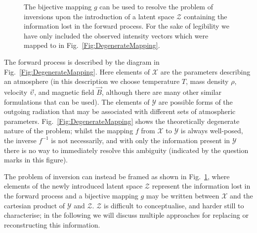\begin{figure}
\caption[Resolving the degeneracy of inversions through the addition of a latent space.]{The bijective mapping $g$ can be used to resolve the problem of inversions upon the introduction of a latent space $\mathcal{Z}$ containing the information lost in the forward process. For the sake of legibility we have only included the observed intensity vectors which were mapped to in Fig.~\ref{Fig:DegenerateMapping}.}
\label{Fig:BijectiveMapping}
\end{figure}

The forward process is described by the diagram in Fig.~\ref{Fig:DegenerateMapping}.
Here elements of $\mathcal{X}$ are the parameters describing an atmosphere (in this description we choose temperature $T$, mass density $\rho$, velocity $\vec{\upsilon}$, and magnetic field $\vec{B}$, although there are many other similar formulations that can be used).
The elements of $\mathcal{Y}$ are possible forms of the outgoing radiation that may be associated with different sets of atmospheric parameters.
Fig.~\ref{Fig:DegenerateMapping} shows the theoretically degenerate nature of the problem; whilst the mapping $f$ from $\mathcal{X}$ to $\mathcal{Y}$ is always well-posed, the inverse $f^{-1}$ is not necessarily, and with only the information present in $\mathcal{Y}$ there is no way to immediately resolve this ambiguity (indicated by the question marks in this figure).

The problem of inversion can instead be framed as shown in Fig.~\ref{Fig:BijectiveMapping}, where elements of the newly introduced latent space $\mathcal{Z}$ represent the information lost in the forward process and a bijective mapping $g$ may be written between $\mathcal{X}$ and the cartesian product of $\mathcal{Y}$ and $\mathcal{Z}$.
$\mathcal{Z}$ is difficult to conceptualise, and harder still to characterise; in the following we will discuss multiple approaches for replacing or reconstructing this information.


